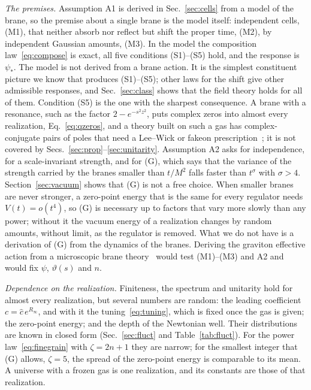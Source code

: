 \documentclass[a4paper,11pt]{article}
\begin{document}
\textit{The premises.} Assumption A1 is derived in Sec.~\ref{sec:cells} from a model of the brane, so the premise about a single brane is the model itself: independent cells, (M1), that neither absorb nor reflect but shift the proper time, (M2), by independent Gaussian amounts, (M3). In the model the composition law~\eqref{eq:compose} is exact, all five conditions (S1)--(S5) hold, and the response is $\psi_*$. The model is not derived from a brane action. It is the simplest constituent picture we know that produces (S1)--(S5); other laws for the shift give other admissible responses, and Sec.~\ref{sec:class} shows that the field theory holds for all of them. Condition (S5) is the one with the sharpest consequence. A brane with a resonance, such as the factor $2-e^{-s^2z^2}$, puts complex zeros into almost every realization, Eq.~\eqref{eq:qzeros}, and a theory built on such a gas has complex-conjugate pairs of poles that need a Lee--Wick or fakeon prescription~\cite{LeeWick1969,Anselmi2017,AnselmiPiva2017}; it is not covered by Secs.~\ref{sec:prop}--\ref{sec:unitarity}. Assumption A2 asks for independence, for a scale-invariant strength, and for (G), which says that the variance of the strength carried by the branes smaller than $t/M^2$ falls faster than $t^{\sigma}$ with $\sigma>4$. Section~\ref{sec:vacuum} shows that (G) is not a free choice. When smaller branes are never stronger, a zero-point energy that is the same for every regulator needs $V(t)=o(t^4)$, so (G) is necessary up to factors that vary more slowly than any power; without it the vacuum energy of a realization changes by random amounts, without limit, as the regulator is removed. What we do not have is a derivation of (G) from the dynamics of the branes. Deriving the graviton effective action from a microscopic brane theory~\cite{Polchinski1995,Johnson2003} would test (M1)--(M3) and A2 and would fix $\psi$, $\vartheta(s)$ and $n$.

\textit{Dependence on the realization.} Finiteness, the spectrum and unitarity hold for almost every realization, but several numbers are random: the leading coefficient $c=\hat c\,e^{R_\infty}$, and with it the tuning~\eqref{eq:tuning}, which is fixed once the gas is given; the zero-point energy; and the depth of the Newtonian well. Their distributions are known in closed form (Sec.~\ref{sec:fluct} and Table~\ref{tab:fluct}). For the power law~\eqref{eq:finegrain} with $\zeta=2n+1$ they are narrow; for the smallest integer that (G) allows, $\zeta=5$, the spread of the zero-point energy is comparable to its mean. A universe with a frozen gas is one realization, and its constants are those of that realization.
\end{document}
